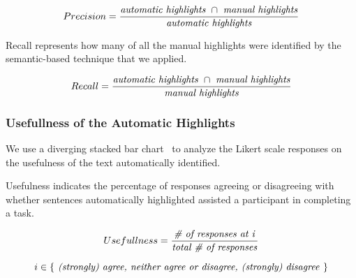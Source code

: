 {\smallskip
\begin{small}


\begin{equation}
    Precision = \frac{
        \text{\textit{automatic highlights}~} \cap 
        \text{~\textit{manual highlights}}
    }{\text{\textit{automatic highlights}}}
\end{equation}
\end{small}


Recall represents how many of all the manual highlights were identified by the semantic-based technique that we applied.

\smallskip
\begin{small}

\begin{equation}
    Recall = \frac{
        \text{\textit{automatic highlights}~} \cap 
        \text{~\textit{manual highlights}}
    }{\text{\textit{manual highlights}}}
\end{equation}
\end{small}

\medskip
{}




\subsubsection{Usefullness of the Automatic Highlights}


We use a diverging stacked bar chart~\cite{Heiberger2014} to analyze the  Likert scale
responses on the usefulness of the text automatically identified.


Usefulness indicates the percentage of responses agreeing or disagreeing with whether sentences
automatically highlighted assisted a participant in completing a task.


\smallskip
\begin{small}

\begin{equation}
Usefullness = \frac{
    \text{\textit{\# of responses at i}}
}{
    \text{\textit{total \# of responses}}
}
\end{equation}
        

\begin{equation*}
i \in \{ 
    \text{\textit{
        (strongly) agree, neither agree or disagree, (strongly) disagree
    }}  
\}
\end{equation*}
\end{small}

}
